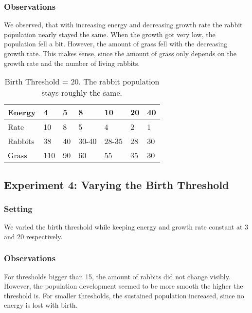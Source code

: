 \documentclass[11pt]{article}
\begin{document}
\subsubsection{Observations}
We observed, that with increasing energy and decreasing growth rate the rabbit population nearly stayed the same.
When the growth got very low, the population fell a bit.
However, the amount of grass fell with the decreasing growth rate.
This makes sense, since the amount of grass only depends on the growth rate and the number of living rabbits.
\begin{table}[]
	\centering
	\caption{Birth Threshold = 20. The rabbit population stays roughly the same.}
	\label{my-label}
	\begin{tabular}{@{}lllllll@{}}
		\toprule
		Energy  & 4   & 5  & 8     & 10    & 20 & 40 \\ \midrule
		Rate    & 10  & 8  & 5     & 4     & 2  & 1  \\
		Rabbits & 38  & 40 & 30-40 & 28-35 & 28 & 30 \\
		Grass   & 110 & 90 & 60    & 55    & 35 & 30 \\ \bottomrule
	\end{tabular}
\end{table}

\subsection{Experiment 4: Varying the Birth Threshold}
\subsubsection{Setting}
We varied the birth threshold while keeping energy and growth rate constant at 3 and 20 respectively.
\subsubsection{Observations}
For thresholds bigger than 15, the amount of rabbits did not change visibly.
However, the population development seemed to be more smooth the higher the threshold is.
For smaller thresholds, the sustained population increased, since no energy is lost with birth.
\end{document}
